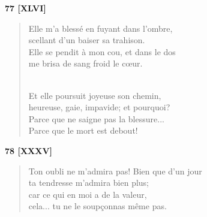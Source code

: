 \documentclass[a4paper,12pt]{book}
\begin{document}
\bigskip

\begin{center} {\bf 77 [XLVI]} \end{center}

\begin{verse}

Elle m'a blessé en fuyant dans l'ombre, \\
scellant d'un baiser sa trahison. \\
Elle se pendit à mon cou, et dans le dos \\
me brisa de sang froid le c{\oe}ur. \\ \

Et elle poursuit joyeuse son chemin, \\
heureuse, gaie, impavide; et pourquoi? \\
Parce que ne saigne pas la blessure... \\
Parce que le mort est debout! \\
\end{verse}

\bigskip

\begin{center} {\bf 78 [XXXV]} \end{center}

\begin{verse}
Ton oubli ne m'admira pas! Bien que d'un jour \\
ta tendresse m'admira bien plus; \\
car ce qui en moi a de la valeur, \\
cela... tu ne le soup\c{c}onnas même pas. \\
\end{verse}



\cleardoublepage

\tableofcontents
\end{document}
